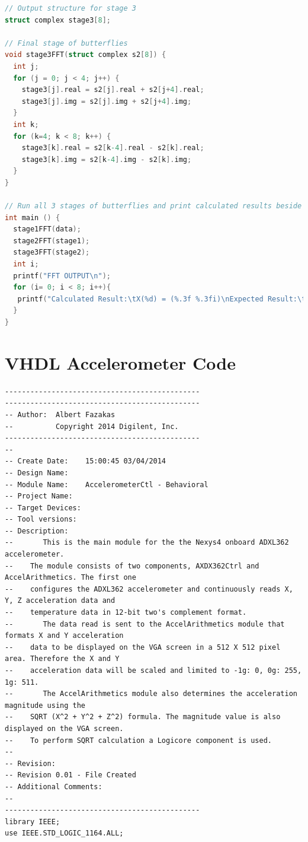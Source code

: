 \documentclass[12pt,a4paper]{report} %
\begin{document}
\begin{appendices}
\begin{lstlisting}[captionpos=b,language=C,frame=single]
// Output structure for stage 3
struct complex stage3[8];

// Final stage of butterflies
void stage3FFT(struct complex s2[8]) {
  int j;
  for (j = 0; j < 4; j++) {
    stage3[j].real = s2[j].real + s2[j+4].real;
    stage3[j].img = s2[j].img + s2[j+4].img;
  }
  int k;
  for (k=4; k < 8; k++) {
    stage3[k].real = s2[k-4].real - s2[k].real;
    stage3[k].img = s2[k-4].img - s2[k].img;
  }
}

// Run all 3 stages of butterflies and print calculated results beside expected results
int main () {
  stage1FFT(data);
  stage2FFT(stage1);
  stage3FFT(stage2);
  int i;
  printf("FFT OUTPUT\n");
  for (i= 0; i < 8; i++){
   printf("Calculated Result:\tX(%d) = (%.3f %.3fi)\nExpected Result:\tX(%d) = (%.3f %.3fi)\n",i, stage3[i].real, stage3[i].img,i,gold[i].real,gold[i].img);
  }
}
\end{lstlisting}
\chapter{VHDL Accelerometer Code}
\begin{lstlisting}[captionpos=b,frame=single]
----------------------------------------------
----------------------------------------------
-- Author:  Albert Fazakas
--          Copyright 2014 Digilent, Inc.
----------------------------------------------
-- 
-- Create Date:    15:00:45 03/04/2014 
-- Design Name: 
-- Module Name:    AccelerometerCtl - Behavioral 
-- Project Name: 
-- Target Devices: 
-- Tool versions: 
-- Description: 
--       This is the main module for the the Nexys4 onboard ADXL362 accelerometer.
--    The module consists of two components, AXDX362Ctrl and AccelArithmetics. The first one
--    configures the ADXL362 accelerometer and continuously reads X, Y, Z acceleration data and
--    temperature data in 12-bit two's complement format. 
--       The data read is sent to the AccelArithmetics module that formats X and Y acceleration 
--    data to be displayed on the VGA screen in a 512 X 512 pixel area. Therefore the X and Y 
--    acceleration data will be scaled and limited to -1g: 0, 0g: 255, 1g: 511.
--       The AccelArithmetics module also determines the acceleration  magnitude using the
--    SQRT (X^2 + Y^2 + Z^2) formula. The magnitude value is also displayed on the VGA screen.
--    To perform SQRT calculation a Logicore component is used.
--
-- Revision: 
-- Revision 0.01 - File Created
-- Additional Comments: 
--
----------------------------------------------
library IEEE;
use IEEE.STD_LOGIC_1164.ALL;


\end{lstlisting}
\end{appendices}
\end{document}

